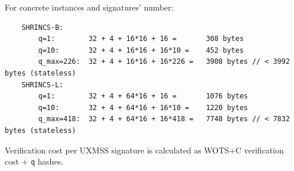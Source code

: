 For concrete instances and signatures' number:
\begin{verbatim}
    SHRINCS-B:
        q=1:        32 + 4 + 16*16 + 16 =       308 bytes
        q=10:       32 + 4 + 16*16 + 16*10 =    452 bytes  
        q_max=226:  32 + 4 + 16*16 + 16*226 =   3908 bytes // < 3992 bytes (stateless)
    SHRINCS-L:
        q=1:        32 + 4 + 64*16 + 16 =       1076 bytes
        q=10:       32 + 4 + 64*16 + 16*10 =    1220 bytes  
        q_max=418:  32 + 4 + 64*16 + 16*418 =   7748 bytes // < 7832 bytes (stateless)
\end{verbatim}

Verification cost per UXMSS signature is calculated as WOTS+C verification cost + \texttt{q} hashes.
